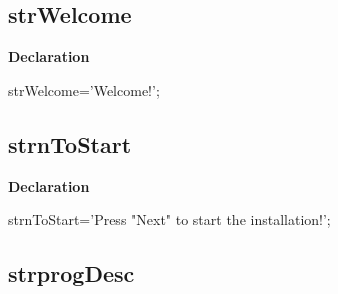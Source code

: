\documentclass{report}
\newif\ifpdf
\begin{document}
\subsection*{strWelcome}
\fi
\label{trstrings-strWelcome}
\begin{list}{}{
\setlength{\itemindent}{0cm}
\setlength{\listparindent}{0cm}
\setlength{\leftmargin}{\evensidemargin}
\addtolength{\leftmargin}{\tmplength}
\settowidth{\labelsep}{X}
\addtolength{\leftmargin}{\labelsep}
\setlength{\labelwidth}{\tmplength}
}
\item[\textbf{Declaration}\hfill]
\ifpdf
\begin{flushleft}
\fi
\begin{ttfamily}
strWelcome='Welcome!';\end{ttfamily}

\ifpdf
\end{flushleft}
\fi

\end{list}
\ifpdf
\subsection*{\large{\textbf{strnToStart}}\normalsize\hspace{1ex}\hrulefill}
\else
\subsection*{strnToStart}
\fi
\label{trstrings-strnToStart}
\begin{list}{}{
\setlength{\itemindent}{0cm}
\setlength{\listparindent}{0cm}
\setlength{\leftmargin}{\evensidemargin}
\addtolength{\leftmargin}{\tmplength}
\settowidth{\labelsep}{X}
\addtolength{\leftmargin}{\labelsep}
\setlength{\labelwidth}{\tmplength}
}
\item[\textbf{Declaration}\hfill]
\ifpdf
\begin{flushleft}
\fi
\begin{ttfamily}
strnToStart='Press "Next" to start the installation!';\end{ttfamily}

\ifpdf
\end{flushleft}
\fi

\end{list}
\ifpdf
\subsection*{\large{\textbf{strprogDesc}}\normalsize\hspace{1ex}\hrulefill}
\else
\end{document}
